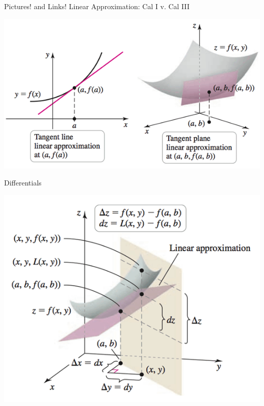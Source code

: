\documentclass[12pt]{beamer}
\theoremstyle{plain}
\theoremstyle{definition}
\begin{document}
%
\begin{frame}[allowframebreaks]{\small Pictures! and Links!}\tiny
{\footnotesize Linear Approximation: Cal I v. Cal III}
\vspace{-1pc}
\begin{center}
\includegraphics[scale=0.5]{12-7linApprox}
\end{center}
%
\framebreak
{\footnotesize Differentials}
\vspace{-1.5pc}
\begin{center}
\includegraphics[scale=0.45]{12-7differentials}
\end{center}
%
\framebreak
\begin{center}

\end{center}
\end{frame}
\end{document}
